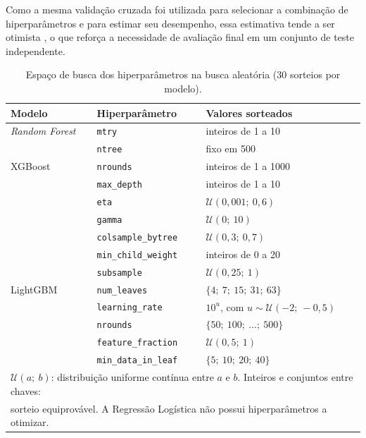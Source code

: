 Como a mesma validação cruzada foi utilizada para selecionar a combinação de hiperparâmetros e para estimar seu desempenho, essa estimativa tende a ser otimista \cite{Cawley2010OverFitting}, o que reforça a necessidade de avaliação final em um conjunto de teste independente.

\begin{table}[htbp]
\centering
\begin{tabular}{lll}
\hline
\textbf{Modelo} & \textbf{Hiperparâmetro} & \textbf{Valores sorteados} \\
\hline
\textit{Random Forest} & \texttt{mtry} & inteiros de 1 a 10 \\
 & \texttt{ntree} & fixo em 500 \\
\hline
XGBoost & \texttt{nrounds} & inteiros de 1 a 1000 \\
 & \texttt{max\_depth} & inteiros de 1 a 10 \\
 & \texttt{eta} & $\mathcal{U}(0{,}001;\ 0{,}6)$ \\
 & \texttt{gamma} & $\mathcal{U}(0;\ 10)$ \\
 & \texttt{colsample\_bytree} & $\mathcal{U}(0{,}3;\ 0{,}7)$ \\
 & \texttt{min\_child\_weight} & inteiros de 0 a 20 \\
 & \texttt{subsample} & $\mathcal{U}(0{,}25;\ 1)$ \\
\hline
LightGBM & \texttt{num\_leaves} & $\{4;\ 7;\ 15;\ 31;\ 63\}$ \\
 & \texttt{learning\_rate} & $10^{u}$, com $u \sim \mathcal{U}(-2;\ -0{,}5)$ \\
 & \texttt{nrounds} & $\{50;\ 100;\ \ldots;\ 500\}$ \\
 & \texttt{feature\_fraction} & $\mathcal{U}(0{,}5;\ 1)$ \\
 & \texttt{min\_data\_in\_leaf} & $\{5;\ 10;\ 20;\ 40\}$ \\
\hline
\multicolumn{3}{l}{\footnotesize $\mathcal{U}(a;\ b)$: distribuição uniforme contínua
entre $a$ e $b$. Inteiros e conjuntos entre chaves:} \\
\multicolumn{3}{l}{\footnotesize sorteio equiprovável. A Regressão Logística não
possui hiperparâmetros a otimizar.} \\
\end{tabular}
\caption{Espaço de busca dos hiperparâmetros na busca aleatória (30 sorteios por
modelo).}
\label{tab:espaco_busca}
\end{table}

